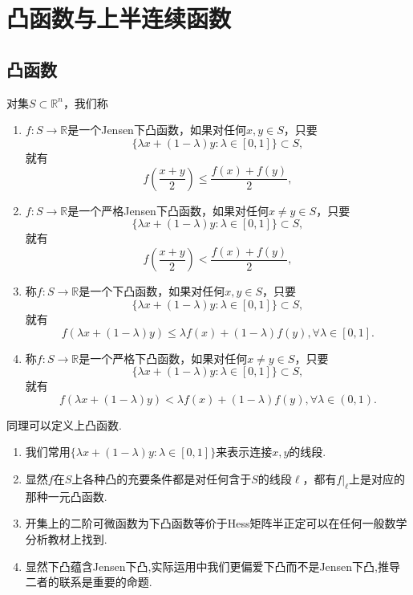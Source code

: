 \documentclass[../../main.tex]{subfiles}%
\begin{document}
\section{凸函数与上半连续函数}

\subsection{凸函数}

\begin{definition}[下凸函数的定义]\label{definition:下凸函数的定义}
对集\(S\subset\mathbb{R}^n\)，我们称
\begin{enumerate}
\item \(f:S\to\mathbb{R}\)是一个Jensen下凸函数，如果对任何\(x,y\in S\)，只要
\[\{\lambda x+(1 - \lambda)y:\lambda\in[0,1]\}\subset S,\]
就有
\[f\left(\frac{x + y}{2}\right)\leqslant\frac{f(x)+f(y)}{2},\]

\item \(f:S\to\mathbb{R}\)是一个严格Jensen下凸函数，如果对任何\(x\neq y\in S\)，只要
\[\{\lambda x+(1 - \lambda)y:\lambda\in[0,1]\}\subset S,\]
就有
\[f\left(\frac{x + y}{2}\right)<\frac{f(x)+f(y)}{2},\]

\item 称\(f:S\to\mathbb{R}\)是一个下凸函数，如果对任何\(x,y\in S\)，只要
\[\{\lambda x+(1 - \lambda)y:\lambda\in[0,1]\}\subset S,\]
就有
\[f(\lambda x+(1 - \lambda)y)\leqslant\lambda f(x)+(1 - \lambda)f(y),\forall\lambda\in[0,1].\]

\item 称\(f:S\to\mathbb{R}\)是一个严格下凸函数，如果对任何\(x\neq y\in S\)，只要
\[\{\lambda x+(1 - \lambda)y:\lambda\in[0,1]\}\subset S,\]
就有
\[f(\lambda x+(1 - \lambda)y)<\lambda f(x)+(1 - \lambda)f(y),\forall\lambda\in(0,1).\]
\end{enumerate}
\end{definition}
\begin{remark}
同理可以定义上凸函数.
\end{remark}
\begin{note}
\begin{enumerate}
\item 我们常用\(\{\lambda x+(1 - \lambda)y:\lambda\in[0,1]\}\)来表示连接\(x,y\)的线段.

\item 显然\(f\)在\(S\)上各种凸的充要条件都是对任何含于\(S\)的线段\(\ell\)，都有\(f|_{\ell}\)上是对应的那种一元凸函数.

\item 开集上的二阶可微函数为下凸函数等价于Hess矩阵半正定可以在任何一般数学分析教材上找到. 

\item 显然下凸蕴含Jensen下凸,实际运用中我们更偏爱下凸而不是Jensen下凸,推导二者的联系是重要的命题. 
\end{enumerate}
\end{note}
\end{document}
